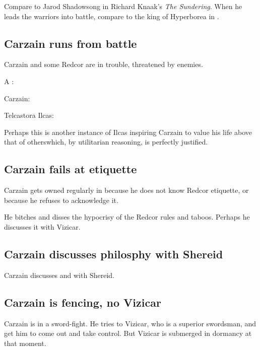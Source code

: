 Compare to Jarod Shadowsong in Richard Knaak's \emph{The Sundering}. When he leads the warriors into battle, compare to the king of Hyperborea in . 







\subsection{Carzain runs from battle}
Carzain and some Redcor are in trouble, threatened by enemies. 

A \gandierre: 

Carzain: 

Telcastora Ilcas: 

Perhaps this is another instance of Ilcas inspiring Carzain to value his life above that of others\dash which, by utilitarian reasoning, is perfectly justified. 







\subsection{Carzain fails at etiquette}
Carzain gets owned regularly in \Redce{} because he does not know Redcor etiquette, or because he refuses to acknowledge it. 

He bitches and disses the hypocrisy of the Redcor rules and taboos. Perhaps he discusses it with Vizicar. 







\subsection{Carzain discusses philosphy with Shereid}
Carzain discusses  and  with Shereid. 








\subsection{Carzain is fencing, no Vizicar}
Carzain is in a sword-fight. He tries to  Vizicar, who is a superior swordsman, and get him to come out and take control. But Vizicar is submerged in dormancy at that moment. 

